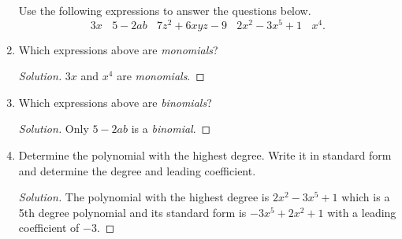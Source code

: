 \documentclass{article}
\begin{document}
\begin{enumerate}
Use the following expressions to answer the questions below. 
\[ 3x ~~~~ 5-2ab ~~~~ 7z^2 + 6xyz - 9 ~~~~ 2x^2 -3x^5 +1 ~~~~ x^4.\]
\item Which expressions above are \textit{monomials}? 
    \begin{proof}[Solution]
    \( 3x \) and \( x^4 \) are \textit{monomials}.
    \end{proof}
\item Which expressions above are \textit{binomials}?  
    \begin{proof}[Solution]
    Only \( 5 - 2ab \) is a  \textit{binomial}.
    \end{proof}
\item Determine the polynomial with the highest degree. Write it in standard form and determine the degree and leading coefficient. 
    \begin{proof}[Solution]
    The polynomial with the highest degree is \( 2x^2 -3x^5 +1\) which is a 5th degree polynomial and its standard form is \( -3x^5 +2x^2 + 1 \) with a leading coefficient of \(-3\).  
    \end{proof}


\end{enumerate}
\end{document}
